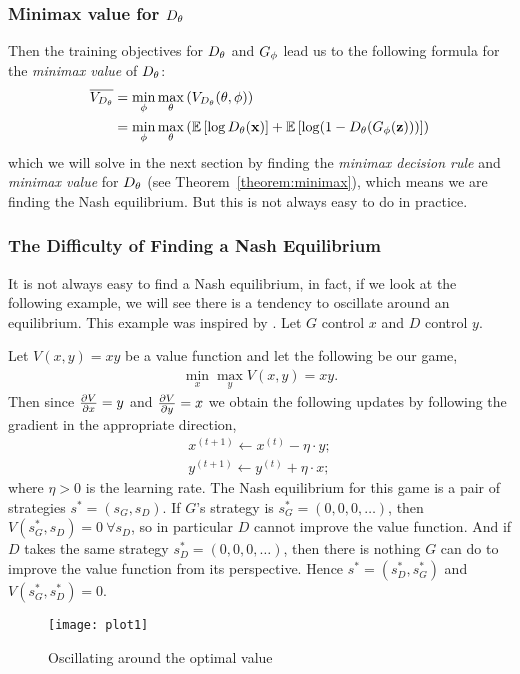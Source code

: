 \subsubsection{Minimax value for $D_\theta$}

Then the training objectives for $D_\theta$ and $G_\phi$ lead us to the
following formula for the \textit{minimax value} of $D_\theta$:
\begin{align}
  \overline{V_{D_\theta}} & = \min_{\phi}\max_{\theta}\left(V_{D_\theta}(\theta,
                      \phi) \right) \\
                    & =
                      \min_{\phi}\max_{\theta}\left(\mathbb{E}\left[\log{D_\theta(\mathbf{x})}\right]
                      +
                      \mathbb{E}\left[\log(1 - D_\theta(G_\phi(\mathbf{z})))\right] \right)
\end{align}
which we will solve in the next section by finding the \textit{minimax
  decision rule} and \textit{minimax value} for $D_\theta$ (see
Theorem~\ref{theorem:minimax}), which means we are finding the Nash
equilibrium.  But this is not always easy to do in practice.

\subsubsection{The Difficulty of Finding a Nash Equilibrium}
\label{sec:difficulty}

It is not always easy to find a Nash equilibrium, in fact, if we look
at the following example, we will see there is a tendency to oscillate
around an equilibrium. This example was inspired by
\cite{ref:weng-2017}.  Let $G$ control $x$ and $D$ control $y$.

\begin{example}
  Let $V(x, y) = xy$ be a value function and let the following be our
  game,
  \begin{align}
    \min_x\max_yV(x, y) = xy.
  \end{align}
  Then since ${\partial{V} \over \partial{x}} = y$ and
  ${\partial{V} \over \partial{y}} = x$ we obtain the following
  updates by following the gradient in the appropriate direction,
  \begin{align}
    x^{(t+1)} \gets x^{(t)} - \eta \cdot y; \\
    y^{(t+1)} \gets y^{(t)} + \eta \cdot x;
  \end{align}
  where $\eta > 0$ is the learning rate. The Nash equilibrium for this
  game is a pair of strategies $s^* = (s_G, s_D)$. If $G$'s strategy
  is $s^*_G = (0, 0, 0, \dots)$, then $V(s^*_G, s_D) = 0\ \forall s_D$, so
  in particular $D$ cannot improve the value function.  And if $D$
  takes the same strategy $s^*_D = (0, 0, 0, \dots)$, then there is
  nothing $G$ can do to improve the value function from its
  perspective.  Hence $s^* = (s^*_D, s^*_G)$ and $V(s^*_G, s^*_D) = 0$.

  \begin{figure}[H]
    \centering
    \texttt{[image: plot1]}
    \caption{Oscillating around the optimal value}
    \label{fig:alternating}
  \end{figure}
\end{example}

